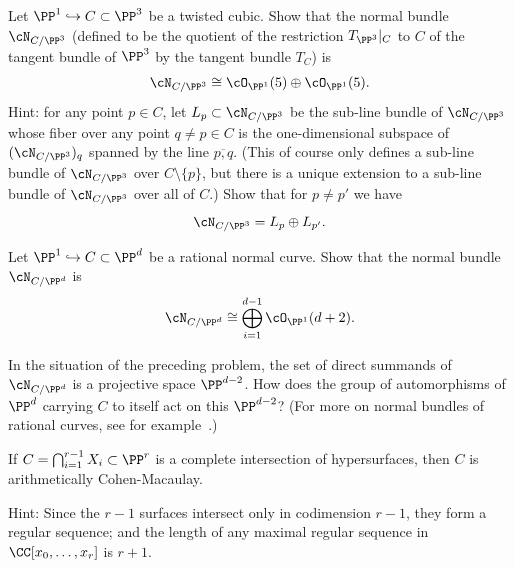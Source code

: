 
\begin{exercise}\label{Normal bundle of cubic}
Let $\PP^1 \hookrightarrow C \subset \PP^3$ be a twisted cubic. Show that the normal bundle $\cN_{C/\PP^3}$ (defined to be the quotient of the restriction $T_{\PP^3}|_C$ to $C$ of the tangent bundle  of $\PP^3$  by the tangent bundle $T_C$) is 
$$
\cN_{C/\PP^3} \cong \cO_{\PP^1}(5) \oplus  \cO_{\PP^1}(5).
$$
Hint: for any point $p \in C$, let $L_p \subset \cN_{C/\PP^3}$ be the sub-line bundle of $\cN_{C/\PP^3}$ whose fiber over any point $q \neq p \in C$ is the one-dimensional subspace of $(\cN_{C/\PP^3})_q$ spanned by the line $\overline{p,q}$. (This of course only defines a sub-line bundle of $\cN_{C/\PP^3}$ over $C \setminus \{p\}$, but there is a unique extension to a sub-line bundle of $\cN_{C/\PP^3}$ over all of $C$.) Show that for $p \neq p'$ we have
$$
\cN_{C/\PP^3} = L_p \oplus L_{p'}.
$$
\end{exercise}

\begin{exercise}
Let $\PP^1 \hookrightarrow C \subset \PP^d$ be a rational normal curve. Show that the normal bundle $\cN_{C/\PP^d}$  is 
$$
\cN_{C/\PP^d} \cong \bigoplus_{i=1}^{d-1} \cO_{\PP^1}(d+2).
$$
\end{exercise}

\begin{exercise}
In the situation of the preceding problem, the set  of direct summands of $\cN_{C/\PP^d} $ is a projective space $\PP^{d-2}$. How does the  group of automorphisms of $\PP^d$ carrying $C$ to itself act on this $\PP^{d-2}$?
(For more on normal bundles of rational curves, see for example~\cite{MR3778979}.)
\end{exercise}

\begin{exercise}\label{ci is acm}
If $C=\bigcap_{i = 1}^{r-1}X_i \subset \PP^r$ is a complete intersection of hypersurfaces,
then $C$ is arithmetically Cohen-Macaulay.

Hint: Since the $r-1$ surfaces intersect only in codimension $r-1$, they form
a regular sequence; and the length of any maximal regular sequence in 
$\CC[x_0,\dots, x_r]$ is $r+1$. \end{exercise}

